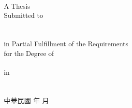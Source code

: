 \documentclass[12pt, a4paper]{report}
\begin{document}
\begin{center}
%
\vfill
\makebox[4cm][s]{\univCname}\\%
\makebox[6cm][s]{\deptCname}\\%
\\%
%
\vfill
\large
A Thesis\\%
Submitted to %
%
\fulldeptEname\\%
%
%
\ifx \collEname  \itsempty
\relax %
\else
\collEname\\%
\fi
%
\univEname\\%
%
in Partial Fulfillment of the Requirements\\
%
for the Degree of\\
%
\degreeEname\\%
%
in\\
%
\deptEname\\%
%
\eMonth\ \eYear\\%
%
\ePlace%
\vfill
中華民國%
\cYear%
年%
\cMonth%
月\\
\end{center}
\normalsize
\clearpage









%
%




%
%
%

\end{document}

